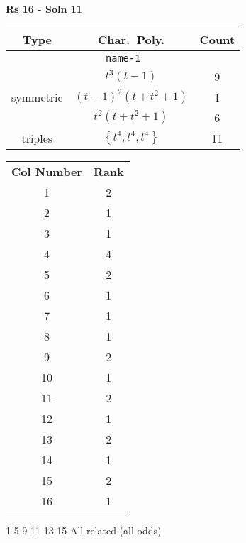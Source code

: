 \documentclass{article}
\begin{document}
    \textbf{Rs 16 - Soln 11}
    \begin{table}
    \begin{tabular}{|c|c|c|}
    \hline
    \textbf{Type} & \textbf{Char.~Poly.} & \textbf{Count} \\
    \hline \multicolumn{3}{|c|}{\texttt{name-1}} \\ \hline
    \multirow{3}{*}{symmetric}
    & $t^3(t - 1)$ & 9 \\
    & $(t - 1)^2(t + t^2 + 1)$ & 1 \\
    & $t^2(t + t^2 + 1)$ & 6 \\
    \hline
    \multirow{1}{*}{triples}
    & $\left\{t^4,t^4,t^4\right\}$ & 11 \\
    \hline
    \end{tabular}
    \end{table}
    \begin{table}
    \begin{tabular}{|c|c|}
    \hline
    \textbf{Col Number} & \textbf{Rank}\\
    1 & 2 \\ 
    2 & 1 \\ 
    3 & 1 \\ 
    4 & 4 \\ 
    5 & 2 \\ 
    6 & 1 \\ 
    7 & 1 \\ 
    8 & 1 \\ 
    9 & 2 \\ 
    10 & 1 \\ 
    11 & 2 \\ 
    12 & 1 \\ 
    13 & 2 \\ 
    14 & 1 \\ 
    15 & 2 \\ 
    16 & 1 \\ 
    \hline
    \end{tabular}
    \end{table}

    1 5 9 11 13 15
    All related (all odds)
    \newpage
\end{document}
